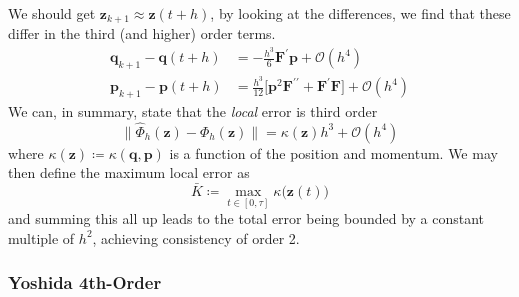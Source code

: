       We should get $\mathbf{z}_{k+1} \approx \mathbf{z}(t + h)$, by looking at the differences, we find that these differ in the third (and higher) order terms. 
      \begin{align*}
        \mathbf{q}_{k+1} - \mathbf{q}(t + h) & = - \frac{h^3}{6} \mathbf{F}^\prime \mathbf{p} + \mathcal{O}(h^4) \\
        \mathbf{p}_{k+1} - \mathbf{p}(t + h) & = \frac{h^3}{12} \big[ \mathbf{p}^2 \mathbf{F}^{\prime\prime} + \mathbf{F}^\prime \mathbf{F} \big] + \mathcal{O}(h^4)
      \end{align*}
      We can, in summary, state that the \textit{local} error is third order
      \begin{equation}
        \|\hat{\Phi}_h (\mathbf{z}) - \Phi_h (\mathbf{z})\| = \kappa(\mathbf{z}) h^3 + \mathcal{O}(h^4)
      \end{equation}
      where $\kappa(\mathbf{z}) \coloneqq \kappa(\mathbf{q}, \mathbf{p})$ is a function of the position and momentum. We may then define the maximum local error as 
      \begin{equation}
        \bar{K} \coloneqq \max_{t \in [0, \tau]} \kappa \big(\mathbf{z}(t)\big)
      \end{equation}
      and summing this all up leads to the total error being bounded by a constant multiple of $h^2$, achieving consistency of order 2. 

    \subsubsection{Yoshida 4th-Order}

